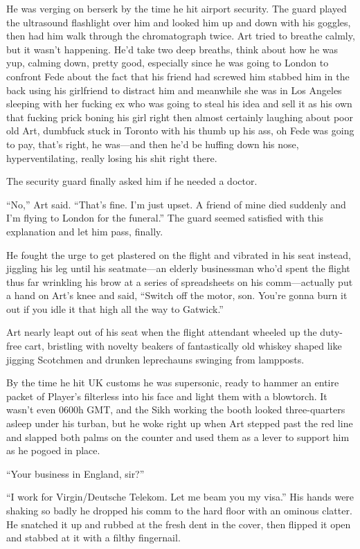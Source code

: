 He was verging on berserk by the time he hit airport security. The
guard played the ultrasound flashlight over him and looked him up
and down with his goggles, then had him walk through the
chromatograph twice. Art tried to breathe calmly, but it wasn’t
happening. He’d take two deep breaths, think about how he was yup,
calming down, pretty good, especially since he was going to London
to confront Fede about the fact that his friend had screwed him
stabbed him in the back using his girlfriend to distract him and
meanwhile she was in Los Angeles sleeping with her fucking ex who
was going to steal his idea and sell it as his own that fucking
prick boning his girl right then almost certainly laughing about
poor old Art, dumbfuck stuck in Toronto with his thumb up his ass,
oh Fede was going to pay, that’s right, he was—and then he’d be
huffing down his nose, hyperventilating, really losing his shit
right there.

The security guard finally asked him if he needed a doctor.

“No,” Art said. “That’s fine. I’m just upset. A friend of mine died
suddenly and I’m flying to London for the funeral.” The guard
seemed satisfied with this explanation and let him pass, finally.

He fought the urge to get plastered on the flight and vibrated in
his seat instead, jiggling his leg until his seatmate—an elderly
businessman who’d spent the flight thus far wrinkling his brow at a
series of spreadsheets on his comm—actually put a hand on Art’s
knee and said, “Switch off the motor, son. You’re gonna burn it out
if you idle it that high all the way to Gatwick.”

Art nearly leapt out of his seat when the flight attendant wheeled
up the duty-free cart, bristling with novelty beakers of
fantastically old whiskey shaped like jigging Scotchmen and drunken
leprechauns swinging from lampposts.

By the time he hit UK customs he was supersonic, ready to hammer an
entire packet of Player’s filterless into his face and light them
with a blowtorch. It wasn’t even 0600h GMT, and the Sikh working
the booth looked three-quarters asleep under his turban, but he
woke right up when Art stepped past the red line and slapped both
palms on the counter and used them as a lever to support him as he
pogoed in place.

“Your business in England, sir?”

“I work for Virgin/Deutsche Telekom. Let me beam you my visa.” His
hands were shaking so badly he dropped his comm to the hard floor
with an ominous clatter. He snatched it up and rubbed at the fresh
dent in the cover, then flipped it open and stabbed at it with a
filthy fingernail.

